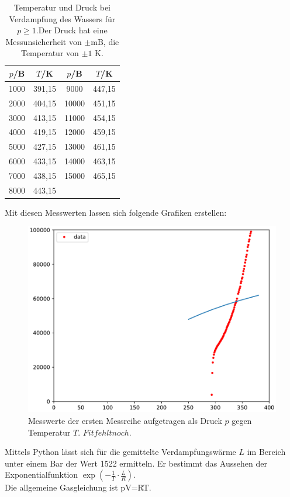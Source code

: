 \begin{table}
  \centering
  \caption{Temperatur und Druck bei Verdampfung des Wassers für $p\geq 1$.Der Druck hat eine Messunsicherheit von
  $\pm$mB, die Temperatur von $\pm 1$ K.}
  \label{tab:Messreihe_2}
\begin{tabular}{
  c c||c c
}
\toprule 
$p$/B & $T$/K & $p$/B & $T$/K\\
\midrule
1000  & 391,15 & 9000  & 447,15\\
2000  & 404,15 & 10000 & 451,15\\
3000  & 413,15 & 11000 & 454,15\\
4000  & 419,15 & 12000 & 459,15\\
5000  & 427,15 & 13000 & 461,15\\
6000  & 433,15 & 14000 & 463,15\\
7000  & 438,15 & 15000 & 465,15\\
8000  & 443,15 &       &       \\
\bottomrule
\end{tabular}
\end{table}

Mit diesen Messwerten lassen sich folgende Grafiken erstellen:
\begin{figure}
  \centering
  \includegraphics[width=\textwidth]{plot_simon1.pdf}
  \caption{Messwerte der ersten Messreihe aufgetragen als Druck $p$ 
  gegen Temperatur $T$. $Fit fehlt noch$.}
\end{figure}
Mittels Python lässt sich für die gemittelte Verdampfungswärme $L$ im Bereich unter einem Bar der Wert
1522 ermitteln. Er bestimmt das Aussehen der Exponentialfunktion $\exp(-\frac{1}{T}\cdot\frac{L}{R})$.
\\
Die allgemeine Gasgleichung ist pV=RT. 
